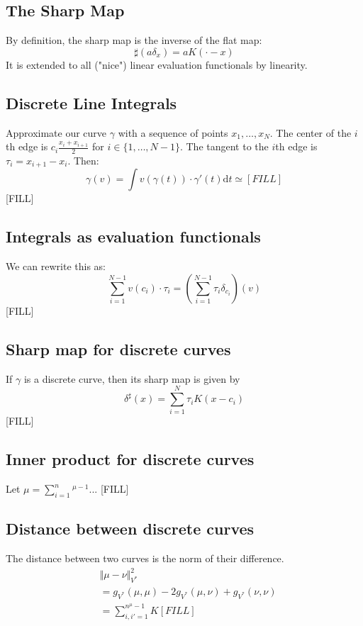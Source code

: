 \documentclass[10pt]{article}
\begin{document}
\subsection*{The Sharp Map}
By definition, the sharp map is the inverse of the flat map:
\[\sharp(a \delta_x) = aK(\cdot - x)\]
It is extended to all ("nice") linear evaluation functionals by linearity.

\subsection*{Discrete Line Integrals}
Approximate our curve $\gamma$ with a sequence of points $x_1, \dots, x_N$.  The center of the $i$th edge is $c_i \frac{x_i + x_{i + 1}}{2}$ for $i \in \{1, \dots, N - 1\}$.  The tangent to the $i$th edge is $\tau_i = x_{i + 1} - x_i$.  Then:
\[\gamma(v) = \int v(\gamma(t)) \cdot \gamma'(t) \text{d}t \simeq [FILL]\]
[FILL]

\subsection*{Integrals as evaluation functionals}
We can rewrite this as:
\[\sum_{i = 1}^{N - 1} v(c_i) \cdot \tau_i = \left(\sum_{i = 1}^{N - 1} \tau_i \delta_{c_i}\right)(v)\]
[FILL]

\subsection*{Sharp map for discrete curves}
If $\gamma$ is a discrete curve, then its sharp map is given by
\[\delta^\sharp(x) = \sum_{i = 1}^N \tau_i K(x - c_i)\]
[FILL]

\subsection*{Inner product for discrete curves}
Let $\mu = \sum_{i = 1}^n^{\mu - 1}$... [FILL]

\subsection*{Distance between discrete curves}
The distance between two curves is the norm of their difference.
\begin{align*}
    &\Vert \mu - \nu \Vert^2_{V^*}\\
    &= g_{V^*}(\mu, \mu) - 2g_{V^*}(\mu, \nu) + g_{V^*}(\nu, \nu)\\
    &= \sum_{i, i' = 1}^{n^\mu - 1} K [FILL]
\end{align*}
\end{document}
